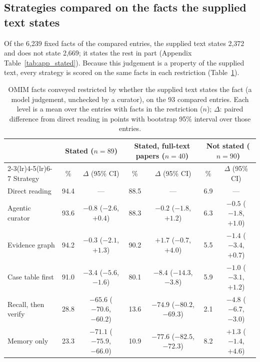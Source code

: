 \documentclass{article} %
\begin{document}
\subsection{Strategies compared on the facts the supplied text states}
\label{sec:stated}
Of the 6,239 fixed facts of the compared entries, the supplied text states 2,372 and does not state 2,669; it states the rest in part (Appendix Table~\ref{tab:app_stated}). Because this judgement is a property of the supplied text, every strategy is scored on the same facts in each restriction (Table~\ref{tab:stated}).

\begin{table}[t]
\caption{OMIM facts conveyed restricted by whether the supplied text states the fact (a model judgement, unchecked by a curator), on the 93 compared entries. Each level is a mean over the entries with facts in the restriction ($n$); $\Delta$: paired difference from direct reading in points with bootstrap 95\% interval over those entries.}
\label{tab:stated}
\begin{center}
\footnotesize
\setlength{\tabcolsep}{2.6pt}
\begin{tabular}{lcccccc}
\toprule
 & \multicolumn{2}{c}{Stated ($n=89$)} & \multicolumn{2}{c}{Stated, full-text papers ($n=40$)} & \multicolumn{2}{c}{Not stated ($n=90$)} \\
\cmidrule(lr){2-3}\cmidrule(lr){4-5}\cmidrule(lr){6-7}
Strategy & \% & $\Delta$ (95\% CI) & \% & $\Delta$ (95\% CI) & \% & $\Delta$ (95\% CI) \\
\midrule
Direct reading & 94.4 & --- & 88.5 & --- & 6.9 & --- \\
Agentic curator & 93.6 & $-0.8$ ($-2.6$, $+0.4$) & 88.3 & $-0.2$ ($-1.8$, $+1.2$) & 6.3 & $-0.5$ ($-1.8$, $+1.0$) \\
Evidence graph & 94.2 & $-0.3$ ($-2.1$, $+1.3$) & 90.2 & $+1.7$ ($-0.7$, $+4.0$) & 5.5 & $-1.4$ ($-3.4$, $+0.7$) \\
Case table first & 91.0 & $-3.4$ ($-5.6$, $-1.6$) & 80.1 & $-8.4$ ($-14.3$, $-3.8$) & 5.9 & $-1.0$ ($-3.1$, $+1.2$) \\
Recall, then verify & 28.8 & $-65.6$ ($-70.6$, $-60.2$) & 13.6 & $-74.9$ ($-80.2$, $-69.3$) & 2.1 & $-4.8$ ($-6.7$, $-3.0$) \\
Memory only & 23.3 & $-71.1$ ($-75.9$, $-66.0$) & 10.9 & $-77.6$ ($-82.5$, $-72.3$) & 8.2 & $+1.3$ ($-1.4$, $+4.6$) \\
\bottomrule
\end{tabular}
\end{center}
\end{table}
\end{document}
